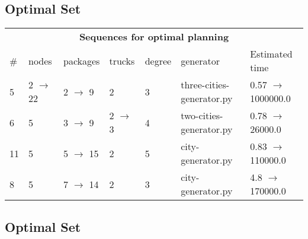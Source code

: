 \documentclass{article}
\begin{document}
                            \subsection*{Optimal Set}

                            \begin{center}
                            \begin{tabular}{@{}l|l|l|l|l|l|l@{}}
                            \multicolumn{7}{c}{\bf \large Sequences for optimal planning}\\
                            \# & nodes & packages & trucks & degree & generator & Estimated time\\\midrule
                            5&2 $\rightarrow$ 22&2 $\rightarrow$ 9&2&3&three-cities-generator.py&0.57 $\rightarrow$ 1000000.0\\
6&5&3 $\rightarrow$ 9&2 $\rightarrow$ 3&4&two-cities-generator.py&0.78 $\rightarrow$ 26000.0\\
11&5&5 $\rightarrow$ 15&2&5&city-generator.py&0.83 $\rightarrow$ 110000.0\\
8&5&7 $\rightarrow$ 14&2&3&city-generator.py&4.8 $\rightarrow$ 170000.0
                            \end{tabular}
                            \end{center}
                    
                                \subsection*{Optimal Set}
                                
\end{document}
